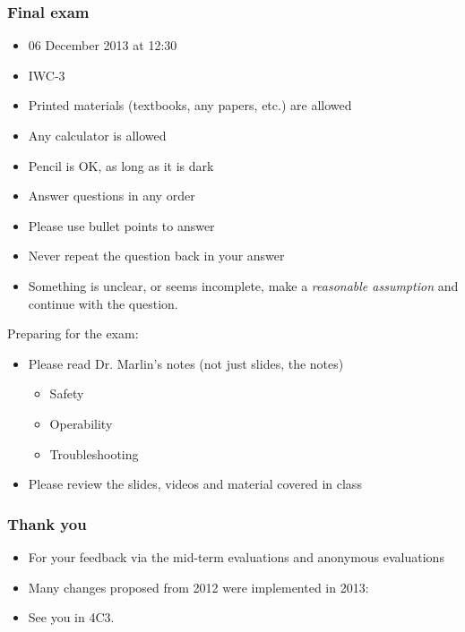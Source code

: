 \begin{frame}\frametitle{Final exam}
	\begin{itemize}
		\item	06 December 2013 at 12:30
		\item	IWC-3
		\item	Printed materials (textbooks, any papers, etc.) are allowed
		\item	Any calculator is allowed
		\item	Pencil is OK, as long as it is dark
		\item	Answer questions in any order
		\item	Please use bullet points to answer
		\item	Never repeat the question back in your answer
		\item	Something is unclear, or seems incomplete, make a \emph{reasonable assumption} and continue with the question.
	\end{itemize}
	\vspace{12pt}
	Preparing for the exam:
	\begin{itemize}
		\item	Please read Dr. Marlin's notes (not just slides, the notes)
		\begin{itemize}
			\item	Safety
			\item	Operability
			\item	Troubleshooting
		\end{itemize}
		\item	Please review the slides, videos and material covered in class
	\end{itemize}
\end{frame}

\begin{frame}\frametitle{Thank you}
	\begin{itemize}
		\item	For your feedback via the mid-term evaluations and anonymous evaluations
		\item	Many changes proposed from 2012 were implemented in 2013:
		\item	{See you in 4C3.}
	\end{itemize}
\end{frame}

\begin{frame}\frametitle{}
	\begin{exampleblock}{}
		\begin{center}\huge {}
		\end{center}
	\end{exampleblock}
\end{frame}